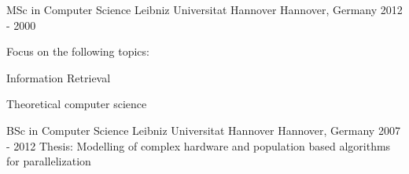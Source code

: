 

\begin{cventries}

  \cventry
    {MSc in Computer Science} %
    {Leibniz Universitat Hannover} %
    {Hannover, Germany} %
    {2012 - 2000} %
    {Focus on the following topics:\vspace{5mm}
	    \begin{cvitems}
	    \item {Information Retrieval}
	    \item {Theoretical computer science}
	    \end{cvitems}
    }

  \cventry
    {BSc in Computer Science} %
    {Leibniz Universitat Hannover} %
    {Hannover, Germany} %
    {2007 - 2012} %
    {Thesis: Modelling of complex hardware and population based algorithms for parallelization}


\end{cventries}
